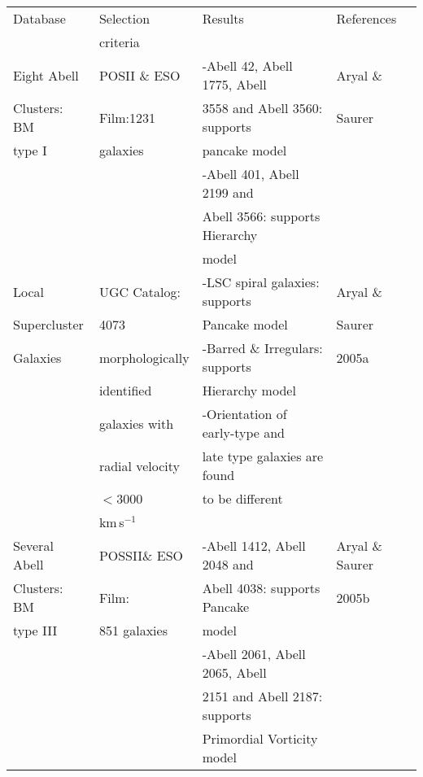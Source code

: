 \begin{center}
\begin{tabular}[lp=7cm]{|l|l|l|l|}
\hline\hline
Database&Selection&Results&References\\
&criteria&&\\
\hline
Eight Abell& POSII \& ESO& -Abell 42, Abell 1775, Abell& Aryal \& \\
Clusters: BM&Film:1231&3558 and Abell 3560: supports&Saurer \\
type I&galaxies&pancake model&\\
&&-Abell 401, Abell 2199 and&\\
&&Abell 3566: supports Hierarchy&\\
&&model&\\
\hline
Local&UGC Catalog:	&-LSC spiral galaxies: supports&Aryal \&\\
Supercluster&4073&Pancake model&Saurer\\
Galaxies&morphologically&-Barred \& Irregulars: supports&2005a\\
&identified	&Hierarchy model&\\
&galaxies with&-Orientation of early-type and&\\
&radial velocity&late type galaxies are found&\\
&$<$3000&to be different&\\
&km\,s$^{-1}$&&\\
\hline
Several Abell	&POSSII\& ESO 	&-Abell 1412, Abell 2048 and	&Aryal \& Saurer\\
Clusters: BM		&Film:			&Abell 4038: supports Pancake& 2005b \\
type III			&851 galaxies	&model						&\\
&&-Abell 2061, Abell 2065, Abell	&\\
&&2151 and Abell 2187: supports&\\
&&Primordial Vorticity model&\\
\hline
\end{tabular}
\end{center}
